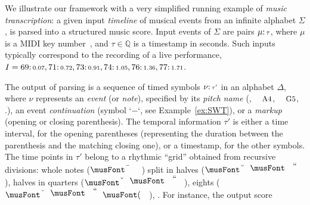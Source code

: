 \begin{example}%
\label{ex:running}
We illustrate our framework with a very simplified %
running example of \emph{music transcription}:
a given input \emph{timeline} of musical events
from an infinite alphabet $\Sigma$,
is parsed into a structured music score.
Input events of $\Sigma$
are pairs $\mu \mathpunct{:}{\scriptstyle \tau}$, where $\mu$ is a
MIDI key number~\cite{Selfridge-Field97beyondMIDI}, %
and $\tau \in \mathbb{Q}$ is a timestamp in seconds.
Such inputs typically correspond
to the recording of a live performance, 
\eg~$I = 69\mathpunct{:}{\scriptstyle 0.07},
	     71\mathpunct{:}{\scriptstyle 0.72},
    	 73\mathpunct{:}{\scriptstyle 0.91},
	     74\mathpunct{:}{\scriptstyle 1.05},
	     76\mathpunct{:}{\scriptstyle 1.36},
	     77\mathpunct{:}{\scriptstyle 1.71}$. %

The output of parsing is a sequence of
timed symbols $\nu\mathpunct{:}{\scriptstyle \tau'}$ in an alphabet $\Delta$,
where $\nu$  represents
an \emph{event} (or \emph{note}),
specified by its \emph{pitch name}
(\eg, $\mbox{\footnotesize A4}$, $\mbox{\footnotesize G5}$, \etc.),
an event \emph{continuation} (symbol `$-$`, see Example~\ref{ex:SWT}),
or a \emph{markup} (opening or closing parenthesis). %
The temporal information $\tau'$ 
is either a time interval, for the opening parentheses
(representing the duration between the parenthesis 
 and the matching closing one), 
or a timestamp, for the other symbols.
The time points in $\tau'$ belong to a rhythmic ``grid'' obtained from recursive divisions:
whole notes ($\musWhole$) split in halves ($\musHalf$), halves
in quarters ($\musQuarter$), eights ($\musEighth$), \etc.
%
For instance, the output score

\end{example}
